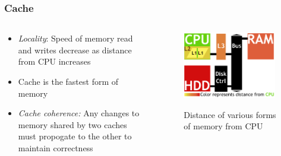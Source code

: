 \documentclass{beamer}
\newcommand{\linespace}{\vskip 0.25cm}
\begin{document}
\begin{frame}
\frametitle{Cache}

\begin{columns}
\begin{column}{0.5\textwidth}
\begin{itemize}
	\item \emph{Locality}: Speed of memory read and writes decrease as distance from CPU increases
	\item Cache is the fastest form of memory
	
	\linespace
	
	\item \emph{Cache coherence:} Any changes to memory shared by two caches must propogate to the other to maintain correctness
\end{itemize}

\end{column}
\begin{column}{0.5\textwidth}
		\begin{figure}
		\includegraphics[width=0.95\textwidth]{Illustrations/CacheAbstract}
		\label{fig:domains}
		\caption{Distance of various forms of memory from CPU}
		\end{figure}
	\end{column}
\end{columns}
\end{frame}
\end{document}
